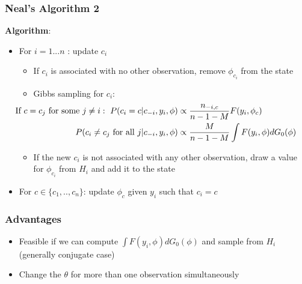 \begin{frame} %
	\frametitle{Neal's Algorithm 2}
	\textbf{Algorithm}:
		\begin{itemize}
		    \item For $i= 1...n$ : update $c_{i}$  \\
		        \begin{itemize}
		            \item If $c_{i}$ is associated with no other observation, remove $\phi_{c_{i}}$ from the state
		            \item Gibbs sampling for $c_{i}$:
		            \begin{align*}
		            \hspace{-35pt}
                    \text{If} \ c=c_{j} \ \text{for some } j\neq i: \ P(c_{i}=c | c_{-i}, y_{i},\mathbf{\phi}) &\propto \frac{n_{-i,c}}{n-1-M} F(y_{i},\phi_{c}) \\
                    P(c_{i}\neq c_{j} \text{ for all } j | c_{-i}, y_{i},\mathbf{\phi}) &\propto \frac{M }{n-1-M} \int F(y_{i},\phi)dG_{0}(\phi)
                    \end{align*}
                    \item  If the new $c_{i}$ is not associated with any other observation, draw a value for $\phi_{c_{i}}$ from $H_{i}$ and add it to the state
                \end{itemize} 
        
            \item For $c \in \{c_{1},..,c_{n}\}$: update $\phi_{c}$ given $y_{i}$ such that $c_{i}=c$
            
		\end{itemize}
		
\end{frame}


\begin{frame} %
	\frametitle{Advantages}
	\begin{itemize}
	    \item  Feasible if we can compute $\int F(y_{i},\phi)dG_{0}(\phi)$ and sample from $H_{i}$ (generally conjugate case)
	    \item  Change the $\theta$ for more than one observation simultaneously
	\end{itemize}

		
\end{frame}


